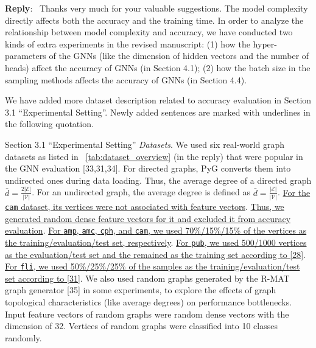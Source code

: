 \documentclass[12pt]{article}
\newenvironment{myquote}[1]%
{\vspace{0.5em}\begin{zitat}{#1}}
{\end{zitat}\vspace{0.5em}}
\newenvironment{reply}
   {\medskip \noindent \textbf{Reply}:\  }
   {\medskip}
\begin{document}
\begin{reply}
    Thanks very much for your valuable suggestions.
    The model complexity directly affects both the accuracy and the training time.
    In order to analyze the relationship between model complexity and accuracy, we have conducted two kinds of extra experiments in the revised manuscript: (1) how the hyper-parameters of the GNNs (like the dimension of hidden vectors and the number of heads) affect the accuracy of GNNs (in Section 4.1); (2) how the batch size in the sampling methods affects the accuracy of GNNs (in Section 4.4).
    
    We have added more dataset description related to accuracy evaluation in Section 3.1 ``Experimental Setting''.
    Newly added sentences are marked with underlines in the following quotation.
    
    \begin{myquote}{Section 3.1 ``Experimental Setting''}
    \emph{Datasets}.
    We used six real-world graph datasets as listed in \tablename~\ref{tab:dataset_overview} (in the reply) that were popular in the GNN evaluation [33,31,34].
    For directed graphs, PyG converts them into undirected ones during data loading.
    Thus, the average degree of a directed graph $\bar{d}=\frac{2|\mathcal{E}|}{|\mathcal{V}|}$.
    For an undirected graph, the average degree is defined as $\bar{d}=\frac{|\mathcal{E}|}{|\mathcal{V}|}$.
    \ul{For the \texttt{cam} dataset, its vertices were not associated with feature vectors}.
    \ul{Thus, we generated random dense feature vectors for it and excluded it from accuracy evaluation}.
    \ul{For \texttt{amp}, \texttt{amc}, \texttt{cph}, and \texttt{cam}, we used 70\%/15\%/15\% of the vertices as the training/evaluation/test set, respectively}.
    \ul{For \texttt{pub}, we used 500/1000 vertices as the evaluation/test set and the remained as the training set according to [28]}.
    \ul{For \texttt{fli}, we used 50\%/25\%/25\% of the samples as the training/evaluation/test set according to [31]}.
    We also used random graphs generated by the R-MAT graph generator [35] in some experiments, to explore the effects of graph topological characteristics (like average degrees) on performance bottlenecks.
    Input feature vectors of random graphs were random dense vectors with the dimension of 32.
    Vertices of random graphs were classified into 10 classes randomly.
    

\end{myquote}
\end{reply}
\end{document}
